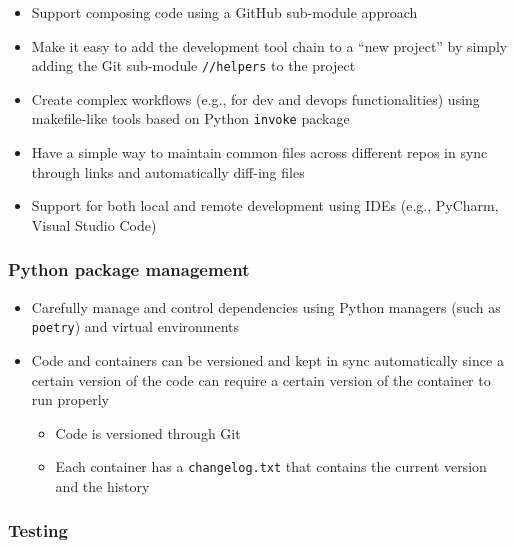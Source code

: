 \documentclass{article}
\begin{document}
\begin{itemize}

  \item Support composing code using a GitHub sub-module approach

  \item Make it easy to add the development tool chain to a ``new project'' by simply
    adding the Git sub-module \texttt{//helpers} to the project

  \item Create complex workflows (e.g., for dev and devops functionalities) using
    makefile-like tools based on Python \texttt{invoke} package

  \item Have a simple way to maintain common files across different repos in sync
    through links and automatically diff-ing files

  \item Support for both local and remote development using IDEs (e.g., PyCharm,
    Visual Studio Code)
\end{itemize}

\subsubsection{Python package management}

\begin{itemize}

  \item Carefully manage and control dependencies using Python managers (such as
    \texttt{poetry}) and virtual environments

  \item Code and containers can be versioned and kept in sync automatically since
    a certain version of the code can require a certain version of the container
    to run properly

    \begin{itemize}

      \item Code is versioned through Git

      \item Each container has a \texttt{changelog.txt} that contains the
        current version and the history
    \end{itemize}
\end{itemize}

\subsubsection{Testing}
\end{document}
